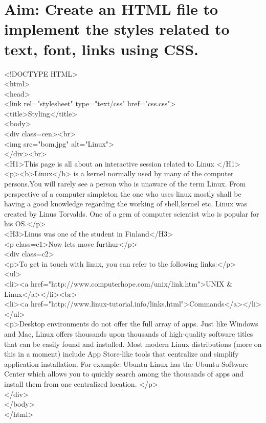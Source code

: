 \section*{\fontsize{16}{14}\selectfont Aim: Create an HTML file to implement the styles related to text, font, links using CSS.}
<!DOCTYPE HTML>\\
<html>\\
<head>\\
<link rel="stylesheet" type="text/css" href="css.css">\\
<title>Styling</title>\\
<body>\\
<div class=cen><br>\\
<img src="bom.jpg" alt="Linux">\\
</div><br>\\
<H1>This page is all about an interactive session related to Linux </H1>\\
<p><b>Linux</b> is a kernel normally used by many of the computer persons.You will rarely see a person who is unaware of the term Linux. From perspective of a computer simpleton the one who uses linux mostly shall be having a good knowledge regarding the working of shell,kernel etc.
Linux was created by Linus Torvalds. One of a gem of computer scientist who is popular for his OS.</p>\\
<H3>Linus was one of the student in Finland</H3>\\
<p class=c1>Now lets move furthur</p>\\
<div class=c2>\\
<p>To get in touch with linux, you can refer to the following links:</p>\\
<ul>\\
<li><a href="http://www.computerhope.com/unix/link.htm">UNIX \& Linux</a></li><br>\\
<li><a href="http://www.linux-tutorial.info/links.html">Commands</a></li>\\
</ul>\\
<p>Desktop environments do not offer the full array of apps. Just like Windows and Mac, Linux offers thousands upon thousands of high-quality software titles that can be easily found and installed. Most modern Linux distributions (more on this in a moment) include App Store-like tools that centralize and simplify application installation. For example: Ubuntu Linux has the Ubuntu Software Center which allows you to quickly search among the thousands of apps and install them from one centralized location. </p>\\
</div>\\
</body>\\
</html>



